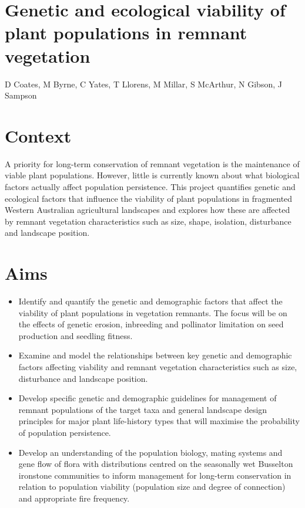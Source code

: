 \documentclass[version=last,
    paper=a4, %
    10pt, %
    usenames,
    dvipsnames,
    oneside, %
    headings=openany, %
    DIV=15 %
]{scrbook}
\begin{document}
\section*{Genetic and ecological viability of plant populations in remnant
vegetation
}

D Coates, M Byrne, C Yates, T Llorens, M Millar, S McArthur, N Gibson, J
Sampson


\section*{Context}
A priority for long-term conservation of remnant vegetation is the
maintenance of viable plant populations. However, little is currently
known about what biological factors actually affect population
persistence. This project quantifies genetic and ecological factors that
influence the viability of plant populations in fragmented Western
Australian agricultural landscapes and explores how these are affected
by remnant vegetation characteristics such as size, shape, isolation,
disturbance and landscape position.



\section*{Aims}
\begin{itemize}
\itemsep1pt\parskip0pt
\item
  Identify and quantify the genetic and demographic factors that affect
  the viability of plant populations in vegetation remnants. The focus
  will be on the effects of genetic erosion, inbreeding and pollinator
  limitation on seed production and seedling fitness.
\item
  Examine and model the relationships between key genetic and
  demographic factors affecting viability and remnant vegetation
  characteristics such as size, disturbance and landscape position.
\item
  Develop specific genetic and demographic guidelines for management of
  remnant populations of the target taxa and general landscape design
  principles for major plant life-history types that will maximise the
  probability of population persistence.
\item
  Develop an understanding of the population biology, mating systems and
  gene flow of flora with distributions centred on the seasonally wet
  Busselton ironstone communities to inform management for long-term
  conservation in relation to population viability (population size and
  degree of connection) and appropriate fire frequency.
\end{itemize}
\end{document}
